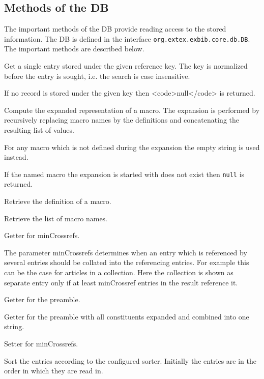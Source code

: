 \subsection{Methods of the DB}

The important methods of the DB provide reading access to the stored
information. The DB is defined in the interface \texttt{org.extex.exbib.core.db.DB}.
The important methods are described below.

\begin{methods}
    Get a single entry stored under the given reference key. The key
    is normalized before the entry is sought, i.e. the search is case
    insensitive.
    
    If no record is stored under the given key then <code>null</code>
    is returned.

    Compute the expanded representation of a macro. The expansion is
    performed by recursively replacing macro names by the definitions
    and concatenating the resulting list of values.
    
    For any macro which is not defined during the expansion the empty
    string is used instead.
    
    If the named macro the expansion is started with does not exist
    then \texttt{null} is returned.

    Retrieve the definition of a macro.

    Retrieve the list of macro names.

    Getter for minCrossrefs.
    
    The parameter minCrossrefs determines when an entry which is
    referenced by several entries should be collated into the
    referencing entries. For example this can be the case for articles
    in a collection. Here the collection is shown as separate entry
    only if at least minCrossref entries in the result reference it.

    Getter for the preamble.

    Getter for the preamble with all constituents expanded and combined into
    one string.

    Setter for minCrossrefs.

    Sort the entries according to the configured sorter.
    Initially the entries are in the order in which they are read in.

\end{methods}

